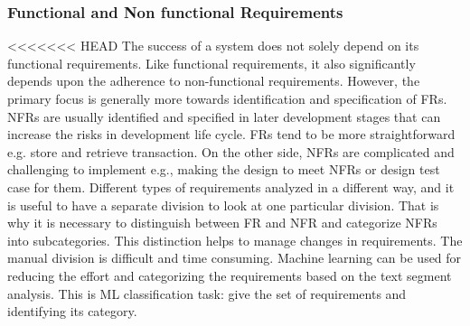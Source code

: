 \subsubsection{Functional and Non functional Requirements}
<<<<<<< HEAD
The success of a system does not solely depend on its functional requirements. Like functional requirements, it also significantly depends upon the adherence to non-functional requirements. However, the primary focus is generally more towards identification and specification of FRs. NFRs are usually identified and specified in later development stages that can increase the risks in development life cycle. FRs tend to be more straightforward e.g. store and retrieve transaction. On the other side, NFRs are complicated and challenging to implement e.g., making the design to meet NFRs or design test case for them. Different types of requirements analyzed in a different way, and it is useful to have a separate division to look at one particular division. That is why it is necessary to distinguish between FR and NFR and categorize NFRs into subcategories. This distinction helps to manage changes in requirements. The manual division is difficult and time consuming. Machine learning can be used for reducing the effort and categorizing the requirements based on the text segment analysis. This is ML classification task: give the set of requirements and identifying its category.\\ 
